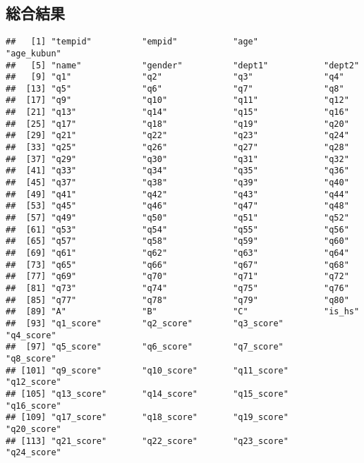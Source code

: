 \documentclass[
  xelatex,ja=standard]{bxjsarticle}
\begin{document}
\subsection{総合結果}\label{ux7dcfux5408ux7d50ux679c}

\begin{verbatim}
##   [1] "tempid"          "empid"           "age"             "age_kubun"      
##   [5] "name"            "gender"          "dept1"           "dept2"          
##   [9] "q1"              "q2"              "q3"              "q4"             
##  [13] "q5"              "q6"              "q7"              "q8"             
##  [17] "q9"              "q10"             "q11"             "q12"            
##  [21] "q13"             "q14"             "q15"             "q16"            
##  [25] "q17"             "q18"             "q19"             "q20"            
##  [29] "q21"             "q22"             "q23"             "q24"            
##  [33] "q25"             "q26"             "q27"             "q28"            
##  [37] "q29"             "q30"             "q31"             "q32"            
##  [41] "q33"             "q34"             "q35"             "q36"            
##  [45] "q37"             "q38"             "q39"             "q40"            
##  [49] "q41"             "q42"             "q43"             "q44"            
##  [53] "q45"             "q46"             "q47"             "q48"            
##  [57] "q49"             "q50"             "q51"             "q52"            
##  [61] "q53"             "q54"             "q55"             "q56"            
##  [65] "q57"             "q58"             "q59"             "q60"            
##  [69] "q61"             "q62"             "q63"             "q64"            
##  [73] "q65"             "q66"             "q67"             "q68"            
##  [77] "q69"             "q70"             "q71"             "q72"            
##  [81] "q73"             "q74"             "q75"             "q76"            
##  [85] "q77"             "q78"             "q79"             "q80"            
##  [89] "A"               "B"               "C"               "is_hs"          
##  [93] "q1_score"        "q2_score"        "q3_score"        "q4_score"       
##  [97] "q5_score"        "q6_score"        "q7_score"        "q8_score"       
## [101] "q9_score"        "q10_score"       "q11_score"       "q12_score"      
## [105] "q13_score"       "q14_score"       "q15_score"       "q16_score"      
## [109] "q17_score"       "q18_score"       "q19_score"       "q20_score"      
## [113] "q21_score"       "q22_score"       "q23_score"       "q24_score"      

\end{verbatim}
\end{document}
